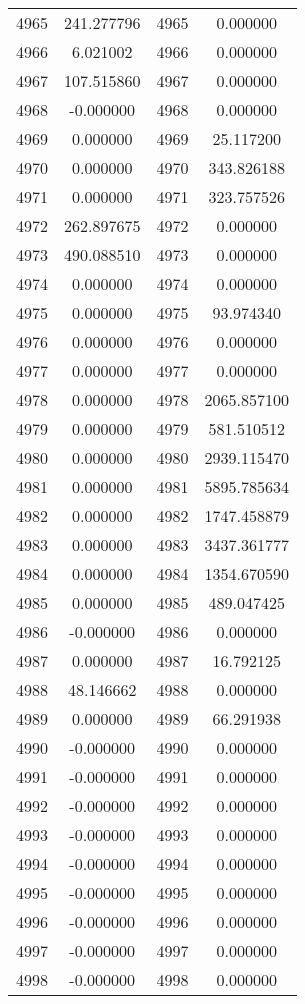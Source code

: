 \documentclass[12pt]{article}
\begin{document}
\begin{longtable}{@{}cccc@{}}
4965 & 241.277796 & 4965 & 0.000000 \\
4966 & 6.021002 & 4966 & 0.000000 \\
4967 & 107.515860 & 4967 & 0.000000 \\
4968 & -0.000000 & 4968 & 0.000000 \\
4969 & 0.000000 & 4969 & 25.117200 \\
4970 & 0.000000 & 4970 & 343.826188 \\
4971 & 0.000000 & 4971 & 323.757526 \\
4972 & 262.897675 & 4972 & 0.000000 \\
4973 & 490.088510 & 4973 & 0.000000 \\
4974 & 0.000000 & 4974 & 0.000000 \\
4975 & 0.000000 & 4975 & 93.974340 \\
4976 & 0.000000 & 4976 & 0.000000 \\
4977 & 0.000000 & 4977 & 0.000000 \\
4978 & 0.000000 & 4978 & 2065.857100 \\
4979 & 0.000000 & 4979 & 581.510512 \\
4980 & 0.000000 & 4980 & 2939.115470 \\
4981 & 0.000000 & 4981 & 5895.785634 \\
4982 & 0.000000 & 4982 & 1747.458879 \\
4983 & 0.000000 & 4983 & 3437.361777 \\
4984 & 0.000000 & 4984 & 1354.670590 \\
4985 & 0.000000 & 4985 & 489.047425 \\
4986 & -0.000000 & 4986 & 0.000000 \\
4987 & 0.000000 & 4987 & 16.792125 \\
4988 & 48.146662 & 4988 & 0.000000 \\
4989 & 0.000000 & 4989 & 66.291938 \\
4990 & -0.000000 & 4990 & 0.000000 \\
4991 & -0.000000 & 4991 & 0.000000 \\
4992 & -0.000000 & 4992 & 0.000000 \\
4993 & -0.000000 & 4993 & 0.000000 \\
4994 & -0.000000 & 4994 & 0.000000 \\
4995 & -0.000000 & 4995 & 0.000000 \\
4996 & -0.000000 & 4996 & 0.000000 \\
4997 & -0.000000 & 4997 & 0.000000 \\
4998 & -0.000000 & 4998 & 0.000000 \\

\end{longtable}
\end{document}
